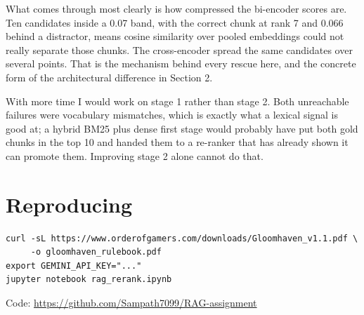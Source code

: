 \documentclass[11pt,a4paper]{article}
\begin{document}
What comes through most clearly is how compressed the bi-encoder scores are. Ten candidates
inside a 0.07 band, with the correct chunk at rank 7 and 0.066 behind a distractor, means
cosine similarity over pooled embeddings could not really separate those chunks. The cross-encoder spread the same candidates over several points. That is
the mechanism behind every rescue here, and the concrete form of the architectural difference
in Section 2.

With more time I would work on stage 1 rather than stage 2. Both unreachable failures were
vocabulary mismatches, which is exactly what a lexical signal is good at; a hybrid BM25 plus
dense first stage would probably have put both gold chunks in the top 10 and handed them to a
re-ranker that has already shown it can promote them. Improving stage 2 alone cannot do that.

\appendix
\section{Reproducing}

{\small
\begin{verbatim}
curl -sL https://www.orderofgamers.com/downloads/Gloomhaven_v1.1.pdf \
     -o gloomhaven_rulebook.pdf
export GEMINI_API_KEY="..."
jupyter notebook rag_rerank.ipynb
\end{verbatim}
}

Code: \url{https://github.com/Sampath7099/RAG-assignment}
\end{document}
